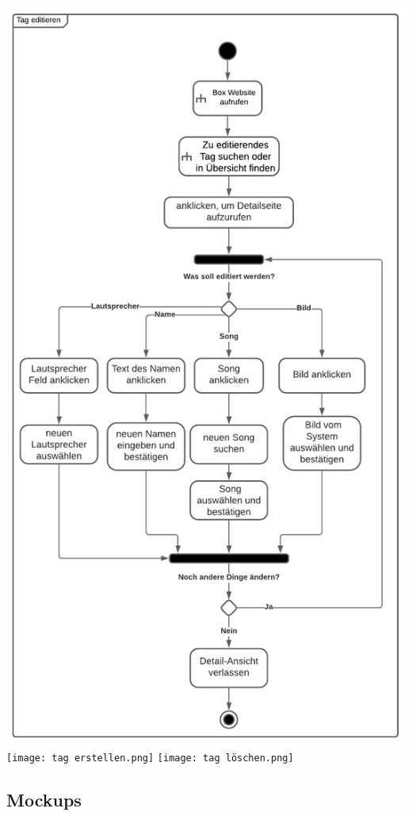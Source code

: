\documentclass[10pt, a4paper]{article}
\begin{document}
  \includegraphics[height=\textheight]{tag editieren.png}
  \newpage
  \texttt{[image: tag erstellen.png]}
  \newpage
  \texttt{[image: tag löschen.png]}


\newpage
\subsection{Mockups}
  \label{FigmaDesigns}
\end{document}
